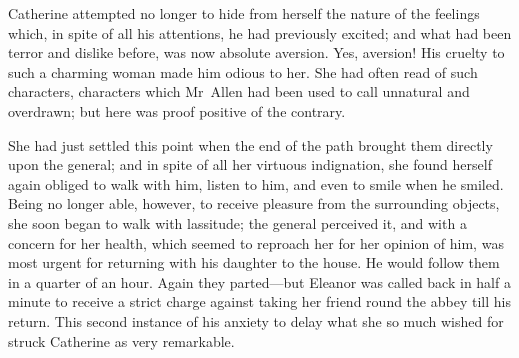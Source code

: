  Catherine attempted no longer to hide from herself the nature of the feelings which, in spite of all his attentions, he had previously excited; and what had been terror and dislike before, was now absolute aversion. Yes, aversion! His cruelty to such a charming woman made him odious to her. She had often read of such characters, characters which Mr~Allen had been used to call unnatural and overdrawn; but here was proof positive of the contrary. 

 She had just settled this point when the end of the path brought them directly upon the general; and in spite of all her virtuous indignation, she found herself again obliged to walk with him, listen to him, and even to smile when he smiled. Being no longer able, however, to receive pleasure from the surrounding objects, she soon began to walk with lassitude; the general perceived it, and with a concern for her health, which seemed to reproach her for her opinion of him, was most urgent for returning with his daughter to the house. He would follow them in a quarter of an hour. Again they parted—but Eleanor was called back in half a minute to receive a strict charge against taking her friend round the abbey till his return. This second instance of his anxiety to delay what she so much wished for struck Catherine as very remarkable. 